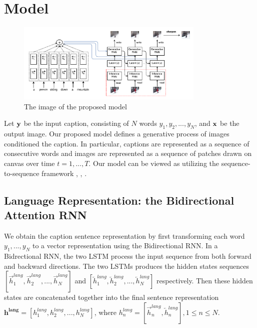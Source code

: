 \documentclass{article} %
\newcommand{\hlang}{h^{lang}}
\newcommand{\hlangall}{\boldsymbol{h^{lang}}}
\newcommand{\icaption}{{\bf{y}}}
\newcommand{\oimage}{{\bf{x}}}
\begin{document}
\section{Model}

\begin{figure}[!t]
\vspace{-0.3in}
\captionsetup[subfigure]{labelformat=empty}
\begin{center}
\includegraphics[width=0.8\textwidth]{figures/alignDraw-cropped.pdf}\quad
%
\end{center}
\vspace{-0.2in}
\caption{The image of the proposed model}
\label{fig:figmodel}
\vspace{-1cm}
\end{figure}
\vspace{-0.1in}

Let $\icaption$ be the input caption, consisting of $N$ words $y_{1}, y_{2}, ..., y_{N}$, and $\oimage$ be the output image. Our proposed model 
defines a generative process of images conditioned the caption. In particular, captions are represented as a sequence of consecutive words and images are represented as a sequence of patches drawn on canvas over time $t=1,...,T$. Our model can be viewed as utilizing the  sequence-to-sequence framework \citep{ilya_mt}, \citep{cho_mt}, \citep{nitish_video}.  

\subsection{Language Representation: the Bidirectional Attention RNN}
\label{sec:lang}
We obtain the caption sentence representation by first transforming each word $y_{1},...,y_{N}$ to a vector representation using the Bidirectional RNN\cite{}. In a Bidrectional RNN, the two LSTM process the input sequence from both forward and backward directions. The two LSTMs produces the hidden states sequences $[\overrightarrow{h}^{lang}_{1}, \overrightarrow{h}^{lang}_{2}, ..., \overrightarrow{h}^{lang}_{N}]$ and $[\overleftarrow{h}^{lang}_{1}, \overleftarrow{h}^{lang}_{2}, ..., \overleftarrow{h}^{lang}_{N}]$ respectively. Then these hidden states are concatenated together into the final sentence representation $\hlangall = [\hlang_{1}, \hlang_{2}, ..., \hlang_{N}]$, where $\hlang_{n} = [\overrightarrow{h}^{lang}_{n}, \overleftarrow{h}^{lang}_{n}], 1\leq n\leq N$.
\end{document}
